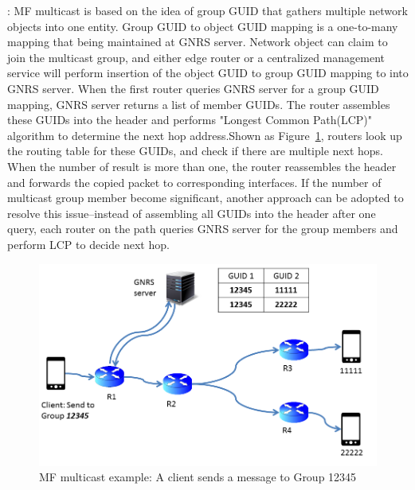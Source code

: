 \vspace{1mm}: MF multicast is based on the idea of group GUID that gathers multiple network objects into one entity. Group GUID  to object GUID mapping is a one-to-many mapping that being maintained at GNRS server. Network object can claim to join the multicast group, and either edge router or a centralized management service will perform insertion of the object GUID to group GUID mapping to into GNRS server. When the first router queries GNRS server for a group GUID mapping, GNRS server returns a list of member GUIDs. The router assembles these GUIDs into the header and performs "Longest Common Path(LCP)" algorithm to determine the next hop address.Shown as Figure~\ref{fig:multicast}, routers look up the routing table for these GUIDs, and check if there are multiple next hops. When the number of result is more than one, the router reassembles the header and forwards the copied packet to corresponding interfaces. If the number of multicast group member become significant, another approach can be adopted to resolve this issue--instead of assembling all GUIDs into the header after one query, each router on the path queries GNRS server for the group members and perform LCP to decide next hop.
\begin{figure}
\centering
\includegraphics[width=\columnwidth]{figure/multicast.png}
\caption{\label{fig:multicast}MF multicast example: A client sends a message to Group 12345}
\end{figure}  